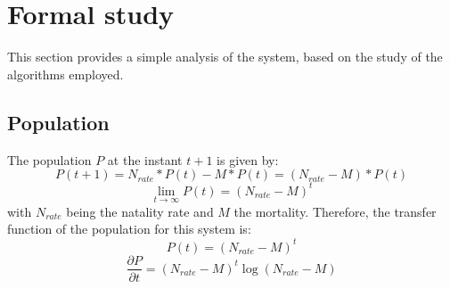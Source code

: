 \documentclass{article}
\begin{document}
\section{Formal study}
This section provides a simple analysis of the system, based on the study of the algorithms employed.

\subsection{Population}
The population $P$ at the instant $t+1$ is given by:
\[
P(t+1) = N_{rate} * P(t) - M*P(t) = (N_{rate} - M) * P(t)
\]
\[
\lim_{t\rightarrow \infty} P(t) = (N_{rate} - M)^t\]
with $N_{rate}$ being the natality rate and $M$ the mortality.
Therefore, the transfer function of the population for this system is:
\[
P(t) = (N_{rate} - M)^t
\]
\[
\frac{\partial P}{\partial t}=(N_{rate} - M)^t \log(N_{rate} - M)
\]
\end{document}
